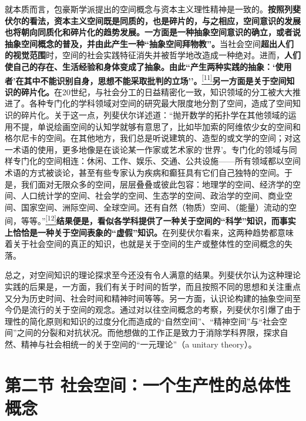 \documentclass[UTF8, fontset = sourcesans, a4paper, oneside, zihao =
-4, scheme=chinese, no-math, space=true]{ctexbook}
\begin{document}
就本质而言，包豪斯学派提出的空间概念与资本主义理性精神是一致的。\textbf{按照列斐伏尔的看法，资本主义空间既是同质的，也是碎片的，与之相应，空间意识的发展也将朝向同质化和碎片化的趋势发展。一方面是一种抽象空间意识的确立，或者说抽象空间概念的普及，并由此产生一种``抽象空间拜物教''。}当社会空间\textbf{超出人们的视觉范围}时，空间的社会实践特征消失并被哲学地改造成一种绝对。进而，\textbf{人们使自己的存在、生活经验和身体变成了抽象。由此``产生两种实践的抽象：`使用者'在其中不能识别自身，思想不能采取批判的立场''。}\protect\hypertarget{part0006_split_001.htmlux5cux23w11}{}{}\protect\hyperlink{part0006_split_003.htmlux5cux23m11}{\textsuperscript{{[}11{]}}}\textbf{另一方面是关于空间知识的碎片化。}在20世纪，与社会分工的日益精密化一致，知识领域的分工被大大推进了。各种专门化的学科领域对空间的研究最大限度地分割了空间，造成了空间知识的碎片化。关于这一点，列斐伏尔详述道：``抛开数学的拓扑学在其他领域的运用不提，单说绘画空间的认知学就够有意思了，比如毕加索的阿维侬少女的空间和格尔尼卡的空间。在其他地方，我们总是听说建筑的、造型的或文学的空间；对这一术语的使用，更多地像是在谈论某一作家或艺术家的`世界'。专门化的领域与同样专门化的空间相连：休闲、工作、娱乐、交通、公共设施------所有领域都以空间术语的方式被谈论，甚至有些专家认为疾病和癫狂具有它们自己独特的空间。于是，我们面对无限众多的空间，层层叠叠或彼此包容：地理学的空间、经济学的空间、人口统计学的空间、社会学的空间、生态学的空间、政治学的空间、商业空间、国家空间、洲际空间、全球空间。还有自然（物质）空间、（能量）流动的空间，等等。''\protect\hypertarget{part0006_split_001.htmlux5cux23w12}{}{}\protect\hyperlink{part0006_split_003.htmlux5cux23m12}{\textsuperscript{{[}12{]}}}\textbf{结果便是，看似各学科提供了一种关于空间的``科学''知识，而事实上恰恰是一种关于空间表象的``虚假''知识。}在列斐伏尔看来，这两种趋势都意味着关于社会空间的真正的知识，也就是关于空间的生产或整体性的空间概念的失落。

总之，对空间知识的理论探求至今还没有令人满意的结果。列斐伏尔认为这种理论实践的后果是，一方面，我们有关于时间的哲学，而且按照不同的思想和关注重点又分为历史时间、社会时间和精神时间等等。另一方面，认识论构建的抽象空间至今仍是流行的关于空间的观念。通过对以往空间概念的考察，列斐伏尔引爆了由于理性的简化原则和知识的过度分化而造成的``自然空间''、``精神空间''与``社会空间''之间的分裂和对抗状况。而他想做的工作正是致力于消除学科界限，探求自然、精神与社会相统一的关于空间的``一元理论''（a
unitary theory）。

\protect\hypertarget{part0006_split_002.html}{}{}

\hypertarget{part0006_split_002.htmlux5cux23b005}{\section{第二节
社会空间：一个生产性的总体性概念}\label{part0006_split_002.htmlux5cux23b005}}
\end{document}
